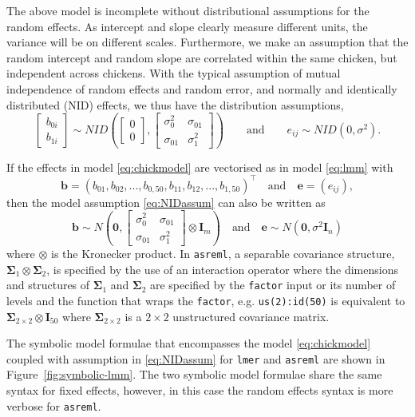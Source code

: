 \documentclass[runningheads]{llncs}\usepackage[]{graphicx}\usepackage[]{color}
\begin{document}
The above model is incomplete without distributional assumptions for the random effects. As intercept and slope clearly measure different units, the variance will be on different scales. Furthermore, we make an assumption that the random intercept and random slope are correlated within the same chicken, but independent across chickens. With the typical assumption of mutual independence of random effects and random error, and normally and identically distributed (NID) effects, we thus have the distribution assumptions,
\begin{equation}
\begin{bmatrix}b_{0i} \\ b_{1i}\end{bmatrix}\sim NID\left(\begin{bmatrix}0\\0 \end{bmatrix}, \begin{bmatrix}\sigma_0^2 & \sigma_{01} \\ \sigma_{01} & \sigma^2_1\end{bmatrix}\right)\qquad\text{and}\qquad e_{ij}\sim NID(0, \sigma^2).\label{eq:NIDassum}
\end{equation}

If the effects in model \eqref{eq:chickmodel} are vectorised as in model \eqref{eq:lmm} with $$\boldsymbol{b} = (b_{01}, b_{02}, ..., b_{0,50}, b_{11}, b_{12}, ..., b_{1,50})^\top\quad\text{and}\quad \boldsymbol{e} = (e_{ij}),$$
then the model assumption \eqref{eq:NIDassum} can also be written as 
$$\boldsymbol{b}  \sim N\left(\boldsymbol{0}, \begin{bmatrix}\sigma_0^2 & \sigma_{01} \\ \sigma_{01} & \sigma^2_1\end{bmatrix}\otimes \mathbf{I}_{m} \right)\quad\text{and}\quad \boldsymbol{e}\sim N(\boldsymbol{0}, \sigma^2\mathbf{I}_n)$$
where $\otimes$ is the Kronecker product. In \texttt{asreml}, a separable covariance structure, $\mathbf{\Sigma}_1 \otimes \mathbf{\Sigma}_2$, is specified by the use of an interaction operator where the dimensions and structures of $\mathbf{\Sigma}_1$ and $\mathbf{\Sigma}_2$ are specified by the \texttt{factor} input or its number of levels and the function that wraps the \texttt{factor}, e.g. \texttt{us(2):id(50)} is equivalent to $\mathbf{\Sigma}_{2\times 2}\otimes \mathbf{I}_{50}$ where $\mathbf{\Sigma}_{2\times 2}$ is a $2\times 2$ unstructured covariance matrix.

The symbolic model formulae that encompasses the model \eqref{eq:chickmodel} coupled with assumption in \eqref{eq:NIDassum} for \texttt{lmer} and \texttt{asreml} are shown in Figure~\ref{fig:symbolic-lmm}. The two symbolic model formulae share the same syntax for fixed effects, however, in this case the random effects syntax is more verbose for \texttt{asreml}.
\end{document}
